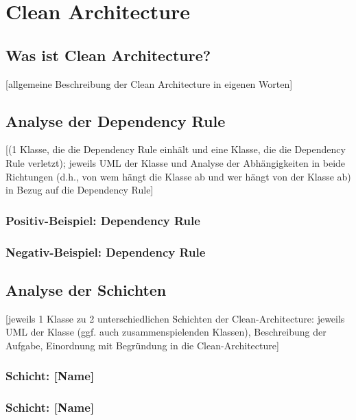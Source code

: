 \chapter{Clean Architecture}

\section{Was ist Clean Architecture?}
[allgemeine Beschreibung der Clean Architecture in eigenen Worten]

\section{Analyse der Dependency Rule}
[(1 Klasse, die die Dependency Rule einhält und eine Klasse, die die Dependency Rule verletzt);   jeweils UML der Klasse und Analyse der Abhängigkeiten in beide Richtungen (d.h., von wem hängt die Klasse ab und wer hängt von der Klasse ab) in Bezug auf die Dependency Rule]

\subsection{Positiv-Beispiel: Dependency Rule}
\subsection{Negativ-Beispiel: Dependency Rule}

\section{Analyse der Schichten}
[jeweils 1 Klasse zu 2 unterschiedlichen Schichten der Clean-Architecture: jeweils UML der Klasse (ggf. auch zusammenspielenden Klassen), Beschreibung der Aufgabe, Einordnung mit Begründung in die Clean-Architecture]

\subsection{Schicht: [Name]}
\subsection{Schicht: [Name]}
